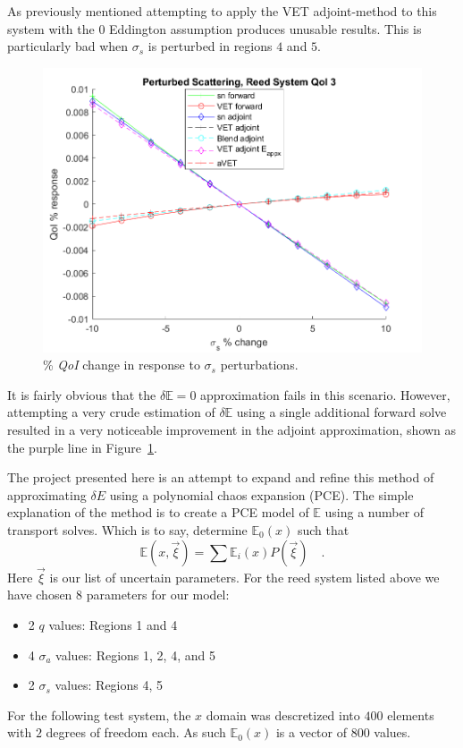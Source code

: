 \documentclass{article}
\newcommand{\Edd}{\mathbb{E}}
\newcommand{\sigs}{\sigma_s}
\newcommand{\siga}{\sigma_a}
\newcommand{\qoi}{{\it QoI}\xspace}
\newcommand{\tcr}[1]{\textcolor{red}{#1}}
\begin{document}
As previously mentioned attempting to apply the VET adjoint-method to this system with the $0$ Eddington assumption produces unusable results. This is particularly bad when $\sigs$ is perturbed in regions $4$ and $5$.
\begin{figure}[H]
\centering
  \includegraphics[width=0.8\linewidth]{772sigsSens.png}
  \caption{\% \qoi change in response to $\sigs$ perturbations.}
\label{fig:thesissens}
\end{figure}
It is fairly obvious that the $\delta \Edd=0$ approximation fails in this scenario. However, attempting a very crude estimation of $\delta \Edd$ using a single additional forward solve resulted in a very noticeable improvement in the adjoint approximation, shown as the purple line in Figure~\ref{fig:thesissens}.


The project presented here is an attempt to expand and refine this method of approximating $\delta E$ using a polynomial chaos expansion (PCE). The simple explanation of the method is to create a PCE model of $\Edd$ using a number of transport solves. Which is to say, determine $\Edd_0(x)$ such that
\begin{equation}
\Edd(x,\vec{\xi}) = \sum \Edd_i(x)P(\vec{\xi}) \quad.
\end{equation}
Here $\vec{\xi}$ is our list of uncertain parameters. For the reed system listed above we have chosen $8$ parameters for our model:
\begin{itemize}
\item 2 $q$ values: Regions 1 and 4
\item 4 $\siga$ values: Regions 1, 2, 4, and 5
\item 2 $\sigs$ values: Regions 4, 5
\end{itemize}
For the following test system, the $x$ domain was descretized into $400$ elements with $2$ degrees of freedom each. As such $\Edd_0(x)$ is a vector of $800$ values.
\end{document}
